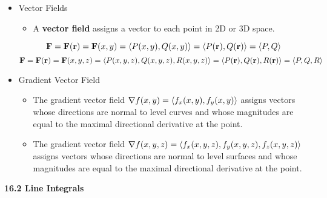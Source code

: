   \begin{itemize}

  \item Vector Fields
    \begin{itemize}
    \item A \textbf{vector field} assigns a vector to each point in 2D or 3D space.
    \end{itemize}
    \[
      \mathbf{F}=\mathbf{F}(\mathbf{r})=\mathbf{F}(x,y)=\left<P(x,y),Q(x,y)\right>=\left<P(\mathbf{r}),Q(\mathbf{r})\right>=\left<P,Q\right>
    \]
    \[
      \mathbf{F}=\mathbf{F}(\mathbf{r})=\mathbf{F}(x,y,z)=\left<P(x,y,z),Q(x,y,z),R(x,y,z)\right>=\left<P(\mathbf{r}),Q(\mathbf{r}),R(\mathbf{r})\right>=\left<P,Q,R\right>
    \]

  \item Gradient Vector Field
    \begin{itemize}
    \item The gradient vector field $\nabla f(x,y)=\left<f_x(x,y),f_y(x,y)\right>$ assigns vectors whose directions are normal to level curves and whose magnitudes are equal to the maximal directional derivative at the point.
    \item The gradient vector field $\nabla f(x,y,z)=\left<f_x(x,y,z),f_y(x,y,z),f_z(x,y,z)\right>$ assigns vectors whose directions are normal to level surfaces and whose magnitudes are equal to the maximal directional derivative at the point. 
    \end{itemize}

  \end{itemize}

\newpage

\centerline{\bf 16.2 Line Integrals}


